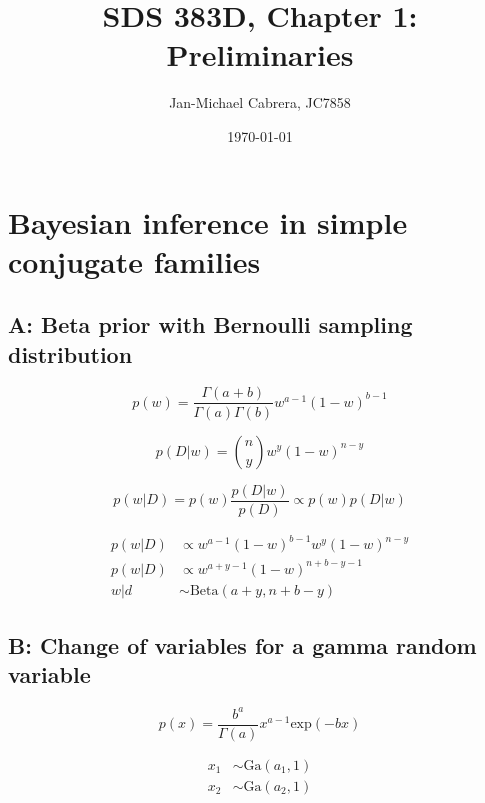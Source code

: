 \documentclass[12pt]{article}
\begin{document}
    \title{SDS 383D, Chapter 1: Preliminaries}
    \author{Jan-Michael Cabrera, JC7858}
    \date{\today}
    \maketitle

    \section*{Bayesian inference in simple conjugate families}

    \subsection*{A: Beta prior with Bernoulli sampling distribution}

        \begin{equation}
              p(w) = \frac{\Gamma(a+b)}{\Gamma(a)\Gamma(b)}w^{a-1}(1-w)^{b-1}
        \end{equation}

        \begin{equation}
              p(D|w) = \binom{n}{y} w^y (1 - w)^{n-y}
        \end{equation}

        \begin{equation}
              p(w|D) = p(w) \frac{p(D|w)}{p(D)} \propto p(w) p(D|w)
        \end{equation}

        \begin{align}
              p(w|D) &\propto w^{a-1}(1-w)^{b-1}w^y(1-w)^{n-y} \\
              p(w|D) &\propto w^{a+y-1}(1-w)^{n+b-y-1} \\
              w|d &\sim \text{Beta}(a+y, n+b-y)
        \end{align}


    \subsection*{B: Change of variables for a gamma random variable}

        \begin{equation}
              p(x) = \frac{b^a}{\Gamma(a)}x^{a-1} \text{exp}(-bx)
        \end{equation}

        \begin{align}
              x_1 &\sim \text{Ga}(a_1, 1)\\
              x_2 &\sim \text{Ga}(a_2, 1)
        \end{align}
\end{document}

